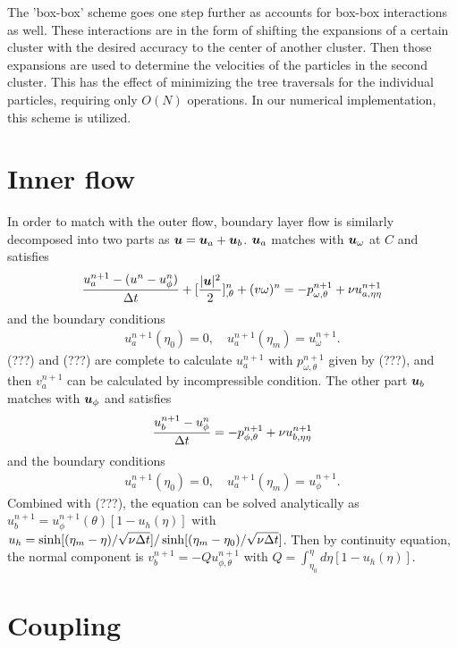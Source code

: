 The 'box-box' scheme goes one step further as accounts for box-box interactions as well. 
These interactions are in the form of shifting the expansions of a certain cluster with the desired accuracy to the center of another cluster.
Then those expansions are used to determine the velocities of the particles in the second cluster.
This has the effect of minimizing the tree traversals for the individual particles, requiring only $O(N)$ operations.
In our numerical implementation, this scheme is utilized.

\section{Inner flow}

In order to match with the outer flow, boundary layer flow is similarly decomposed into two parts as $\boldsymbol{u} = \boldsymbol{u}_a + \boldsymbol{u}_b$.
$\boldsymbol{u}_a$ matches with $\boldsymbol{u}_\omega$ at $C$ and satisfies
\begin{align} \label{eqn:ua}
\frac{u_a^{n+1}-(u^n-u_\phi^n) }{\Delta t}  + [\frac{|\boldsymbol{u}|^2}{2}]^n_{,\theta} + (v \omega)^n
 =   -p^{n+1}_{\omega,\theta} + \nu u^{n+1}_{a,\eta\eta}
\end{align}
and the boundary conditions
\begin{align} \label{eqn:uaBC}
u_a^{n+1}(\eta_0) = 0, \quad u_a^{n+1}(\eta_m) = u_\omega^{n+1}.
\end{align}
(???) and (???) are complete to calculate $u_a^{n+1}$ with $p_{\omega, \theta}^{n+1}$ given by (???), and then $v_a^{n+1}$ can be calculated by incompressible condition.
The other part $\boldsymbol{u}_b$ matches with $\boldsymbol{u}_\phi$ and satisfies
\begin{align} \label{eqn:ub}
\frac{u_b^{n+1}- u_\phi^n }{\Delta t} =   -p^{n+1}_{\phi,\theta} + \nu u^{n+1}_{b,\eta\eta}
\end{align}
and the boundary conditions
\begin{align} \label{eqn:ubBC}
u_a^{n+1}(\eta_0) = 0, \quad u_a^{n+1}(\eta_m) = u_\phi^{n+1}.
\end{align}
Combined with (???), the equation can be solved analytically as  $u_b^{n+1} = u_{\phi}^{n+1}(\theta) [1- u_h(\eta)] $ with $u_h = \sinh[(\eta_m - \eta)/\sqrt{\nu \Delta t}] / \sinh[(\eta_m - \eta_0)/\sqrt{\nu \Delta t}]$. Then by continuity equation, the normal component is $v_b^{n+1} = -Q u_{\phi,\theta}^{n+1}$ with $Q = \int_{\eta_0}^{\eta} d\eta [1 - u_h(\eta)]$.


\section{Coupling}

